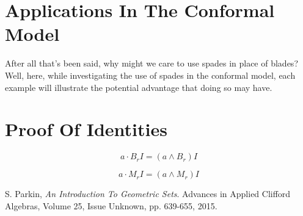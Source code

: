 \documentclass{birkjour}
\theoremstyle{definition}
\theoremstyle{remark}
\numberwithin{equation}{section}
\begin{document}



\section{Applications In The Conformal Model}

After all that's been said, why might we care to use spades in place of blades?  Well, here, while investigating the use of
spades in the conformal model, each example will illustrate the potential advantage that doing so may have.


\section{Proof Of Identities}



\begin{equation}
a\cdot B_rI = (a\wedge B_r)I
\end{equation}

\begin{equation}
a\cdot M_rI = (a\wedge M_r)I
\end{equation}

\begin{thebibliography}{9}

S. Parkin,
\emph{An Introduction To Geometric Sets}.
Advances in Applied Clifford Algebras, Volume 25, Issue Unknown, pp. 639-655, 2015.

\end{thebibliography}
\end{document}
